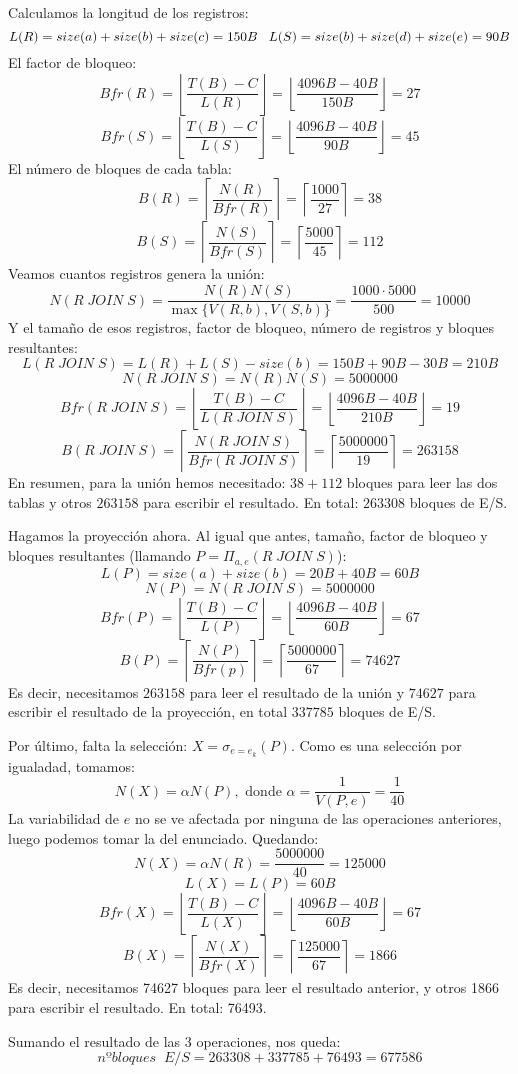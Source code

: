 \documentclass[12pt]{report}
\begin{document}
Calculamos la longitud de los registros:
\[
L(R)=size(a)+size(b)+size(c)=150B \;\;\; L(S)=size(b)+size(d)+size(e)=90B
\]
El factor de bloqueo:
\[
Bfr(R)=\left\lfloor\frac{T(B)-C}{L(R)}\right\rfloor=\left\lfloor\frac{4096B-40B}{150B}\right\rfloor=27
\]
\[
Bfr(S)=\left\lfloor\frac{T(B)-C}{L(S)}\right\rfloor=\left\lfloor\frac{4096B-40B}{90B}\right\rfloor=45
\]
El número de bloques de cada tabla:
\[
B(R)=\left\lceil\frac{N(R)}{Bfr(R)}\right\rceil=\left\lceil\frac{1000}{27}\right\rceil=38
\]
\[
B(S)=\left\lceil\frac{N(S)}{Bfr(S)}\right\rceil=\left\lceil\frac{5000}{45}\right\rceil=112
\]
Veamos cuantos registros genera la unión:
\[
N(R\;JOIN\;S)=\frac{N(R)N(S)}{\max\{V(R,b),V(S,b)\}}= \frac{1000\cdot 5000}{500}=10000
\]
Y el tamaño de esos registros, factor de bloqueo, número de registros y bloques resultantes:
\[
L(R\;JOIN\;S)=L(R)+L(S)-size(b)=150B+90B-30B=210B
\]
\[
N(R\;JOIN\;S)=N(R)N(S)=5000000
\]
\[
Bfr(R\;JOIN\;S)=\left\lfloor\frac{T(B)-C}{L(R\;JOIN\;S)}\right\rfloor=\left\lfloor\frac{4096B-40B}{210B}\right\rfloor=19
\]
\[
B(R\;JOIN\;S)=\left\lceil\frac{N(R\;JOIN\;S)}{Bfr(R\;JOIN\;S)}\right\rceil=\left\lceil\frac{5000000}{19}\right\rceil=263158
\]
En resumen, para la unión hemos necesitado: $38+112$ bloques para leer las dos tablas y otros $263158$ para escribir el resultado. En total: $263308$ bloques de E/S.

Hagamos la proyección ahora. Al igual que antes, tamaño, factor de bloqueo y bloques resultantes (llamando $P=\Pi_{a,e}(R\;JOIN\;S)$):
\[
L(P)=size(a)+size(b)=20B+40B=60B
\]
\[
N(P)=N(R\;JOIN\;S)=5000000
\]
\[
Bfr(P)=\left\lfloor\frac{T(B)-C}{L(P)}\right\rfloor=\left\lfloor\frac{4096B-40B}{60B}\right\rfloor=67
\]
\[
B(P)=\left\lceil\frac{N(P)}{Bfr(p)}\right\rceil=\left\lceil\frac{5000000}{67}\right\rceil=74627
\]
Es decir, necesitamos $263158$ para leer el resultado de la unión y $74627$ para escribir el resultado de la proyección, en total $337785$ bloques de E/S.

Por último, falta la selección: $X=\sigma_{e=e_k}(P)$. Como es una selección por igualadad, tomamos:
\[
N(X)=\alpha N(P), \text{ donde } \alpha=\frac{1}{V(P,e)}=\frac{1}{40}
\]
La variabilidad de $e$ no se ve afectada por ninguna de las operaciones anteriores, luego podemos tomar la del enunciado. Quedando:
\[
N(X)=\alpha N(R)=\frac{5000000}{40}=125000
\]
\[
L(X)=L(P)=60B
\]
\[
Bfr(X)=\left\lfloor\frac{T(B)-C}{L(X)}\right\rfloor=\left\lfloor\frac{4096B-40B}{60B}\right\rfloor=67
\]
\[
B(X)=\left\lceil\frac{N(X)}{Bfr(X)}\right\rceil=\left\lceil\frac{125000}{67}\right\rceil=1866
\]
Es decir, necesitamos 74627 bloques para leer el resultado anterior, y otros 1866 para escribir el resultado. En total: 76493.

Sumando el resultado de las 3 operaciones, nos queda:
\[
nºbloques \;\; E/S = 263308 + 337785 + 76493=677586
\]
\end{document}
